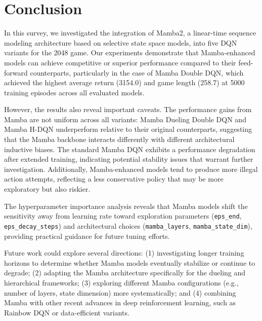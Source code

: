 \documentclass[conference]{IEEEtran}
\begin{document}
\section{Conclusion}

In this survey, we investigated the integration of Mamba2, a linear-time sequence modeling architecture based on selective state space models, into five DQN variants for the 2048 game. Our experiments demonstrate that Mamba-enhanced models can achieve competitive or superior performance compared to their feed-forward counterparts, particularly in the case of Mamba Double DQN, which achieved the highest average return (3154.0) and game length (258.7) at 5000 training episodes across all evaluated models.

However, the results also reveal important caveats. The performance gains from Mamba are not uniform across all variants: Mamba Dueling Double DQN and Mamba H-DQN underperform relative to their original counterparts, suggesting that the Mamba backbone interacts differently with different architectural inductive biases. The standard Mamba DQN exhibits a performance degradation after extended training, indicating potential stability issues that warrant further investigation. Additionally, Mamba-enhanced models tend to produce more illegal action attempts, reflecting a less conservative policy that may be more exploratory but also riskier.

The hyperparameter importance analysis reveals that Mamba models shift the sensitivity away from learning rate toward exploration parameters (\texttt{eps\_end}, \texttt{eps\_decay\_steps}) and architectural choices (\texttt{mamba\_layers}, \texttt{mamba\_state\_dim}), providing practical guidance for future tuning efforts.

Future work could explore several directions: (1) investigating longer training horizons to determine whether Mamba models eventually stabilize or continue to degrade; (2) adapting the Mamba architecture specifically for the dueling and hierarchical frameworks; (3) exploring different Mamba configurations (e.g., number of layers, state dimension) more systematically; and (4) combining Mamba with other recent advances in deep reinforcement learning, such as Rainbow DQN or data-efficient variants.
\end{document}
